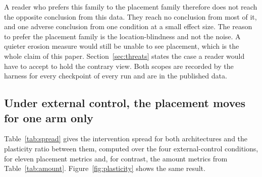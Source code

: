 \documentclass[11pt,a4paper]{article}
\begin{document}
A reader who prefers this family to the placement family therefore does not reach
the opposite conclusion from this data. They reach no conclusion from most of it,
and one adverse conclusion from one condition at a small effect size. The reason
to prefer the placement family is the location-blindness and not the noise. A
quieter erosion measure would still be unable to see placement, which is the whole
claim of this paper. Section~\ref{sec:threats} states the case a reader would have
to accept to hold the contrary view. Both scopes are recorded by the harness for
every checkpoint of every run and are in the published data.

\subsection{Under external control, the placement moves for one arm only}

Table~\ref{tab:spread} gives the intervention spread for both architectures and
the plasticity ratio between them, computed over the four external-control
conditions, for eleven placement metrics and, for contrast, the amount metrics
from Table~\ref{tab:amount}. Figure~\ref{fig:plasticity} shows the same result.
\end{document}

